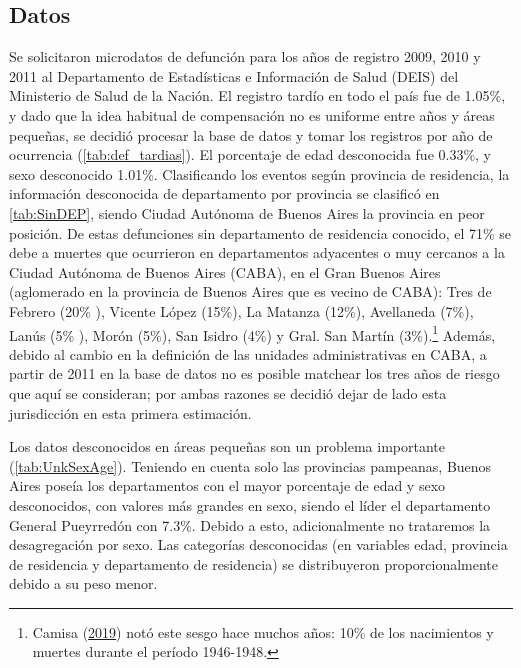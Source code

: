 \documentclass[12pt,]{article}
\begin{document}
\hypertarget{datos}{%
\subsection{\texorpdfstring{\textbf{Datos}}{Datos}}\label{datos}}

Se solicitaron microdatos de defunción para los años de registro 2009,
2010 y 2011 al Departamento de Estadísticas e Información de Salud
(DEIS) del Ministerio de Salud de la Nación. El registro tardío en todo
el país fue de 1.05\%, y dado que la idea habitual de compensación no es
uniforme entre años y áreas pequeñas, se decidió procesar la base de
datos y tomar los registros por año de ocurrencia
(\ref{tab:def_tardias}). El porcentaje de edad desconocida fue 0.33\%, y
sexo desconocido 1.01\%. Clasificando los eventos según provincia de
residencia, la información desconocida de departamento por provincia se
clasificó en \ref{tab:SinDEP}, siendo Ciudad Autónoma de Buenos Aires la
provincia en peor posición. De estas defunciones sin departamento de
residencia conocido, el 71\% se debe a muertes que ocurrieron en
departamentos adyacentes o muy cercanos a la Ciudad Autónoma de Buenos
Aires (CABA), en el Gran Buenos Aires (aglomerado en la provincia de
Buenos Aires que es vecino de CABA): Tres de Febrero (20\% ), Vicente
López (15\%), La Matanza (12\%), Avellaneda (7\%), Lanús (5\% ), Morón
(5\%), San Isidro (4\%) y Gral. San Martín (3\%).\footnote{Camisa
  (\protect\hyperlink{ref-Camisa_2019}{2019}) notó este sesgo hace
  muchos años: 10\% de los nacimientos y muertes durante el período
  1946-1948.} Además, debido al cambio en la definición de las unidades
administrativas en CABA, a partir de 2011 en la base de datos no es
posible matchear los tres años de riesgo que aquí se consideran; por
ambas razones se decidió dejar de lado esta jurisdicción en esta primera
estimación.

Los datos desconocidos en áreas pequeñas son un problema importante
(\ref{tab:UnkSexAge}). Teniendo en cuenta solo las provincias pampeanas,
Buenos Aires poseía los departamentos con el mayor porcentaje de edad y
sexo desconocidos, con valores más grandes en sexo, siendo el líder el
departamento General Pueyrredón con 7.3\%. Debido a esto, adicionalmente
no trataremos la desagregación por sexo. Las categorías desconocidas (en
variables edad, provincia de residencia y departamento de residencia) se
distribuyeron proporcionalmente debido a su peso menor.
\end{document}
